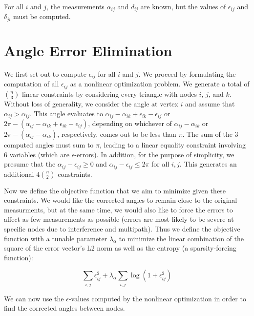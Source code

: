 \documentclass[12pt]{article}
\begin{document}
For all $i$ and $j$, the measurements $\alpha_{ij}$ and  $d_{ij}$ are known, but the values of $\epsilon_{ij}$ and $ \delta_{ji}$ must be computed. 

\section{Angle Error Elimination}
We first set out to compute $\epsilon_{ij}$ for all $i$ and $j$. We proceed by formulating the computation of all $\epsilon_{ij}$ as a nonlinear optimization problem. We generate a total of $n \choose 3$ linear constraints by considering every triangle with nodes $i$, $j$, and $k$. Without loss of generality, we consider the angle at vertex $i$ and assume that $\alpha_{ij} > \alpha_{ij}$. This angle evaluates to $\alpha_{ij} - \alpha_{ik} +  \epsilon_{ik} - \epsilon_{ij}$ or $2\pi - (\alpha_{ij} - \alpha_{ik} +  \epsilon_{ik} - \epsilon_{ij})$, depending on whichever of $\alpha_{ij} - \alpha_{ik}$ or $2\pi - (\alpha_{ij} - \alpha_{ik})$, respectively, comes out to be less than $\pi$. The sum of the 3 computed angles must sum to $\pi$, leading to a linear equality constraint involving 6 variables (which are $\epsilon$-errors). In addition, for the purpose of simplicity, we presume that the $\alpha_{ij} - \epsilon_{ij} \ge 0$ and $\alpha_{ij} - \epsilon_{ij} \le 2\pi$ for all $i,j$. This generates an additional $4{n \choose 2}$ constraints. 

Now we define the objective function that we aim to minimize given these constraints. We would like the corrected angles to remain close to the original measurments, but at the same time, we would also like to force the errors to affect as few measurements as possible (errors are most likely to be severe at specific nodes due to interference and multipath). Thus we define the objective function with a tunable parameter $\lambda_\alpha$ to minimize the linear combination of the square of the error vector's L2 norm as well as the entropy (a sparsity-forcing function):

$$\sum_{i,j}{\epsilon_{ij}^2} + \lambda_\alpha\sum_{i,j}{\log(1+ \epsilon_{ij}^2)} $$

We can now use the $\epsilon$-values computed by the nonlinear optimization in order to find the corrected angles between nodes.
\end{document}
